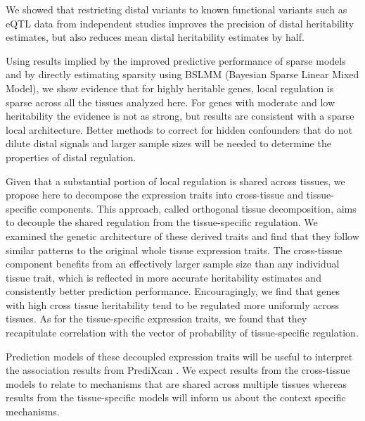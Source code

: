 \documentclass[10pt,letterpaper]{article}
\begin{document}
We showed that restricting distal variants to known functional variants such as eQTL data from independent studies improves the precision of distal heritability estimates, but also reduces mean distal heritability estimates by half. %

Using results implied by the improved predictive performance of sparse models and by directly estimating sparsity using BSLMM (Bayesian Sparse Linear Mixed Model), we show evidence that for highly heritable genes, local regulation is sparse across all the tissues analyzed here. For genes with moderate and low heritability the evidence is not as strong, but results are consistent with a sparse local architecture. Better methods to correct for hidden confounders that do not dilute distal signals and larger sample sizes will be needed to determine the properties of distal regulation. 

Given that a substantial portion of local regulation is shared across tissues, we propose here to decompose the expression traits into cross-tissue and tissue-specific components. This approach, called orthogonal tissue decomposition, aims to decouple the shared regulation from the tissue-specific regulation. We examined the genetic architecture of these derived traits and find that they follow similar patterns to the original whole tissue expression traits. The cross-tissue component benefits from an effectively larger sample size than any individual tissue trait, which is reflected in more accurate heritability estimates and consistently better prediction performance. Encouragingly, we find that genes with high cross tissue heritability tend to be regulated more uniformly across tissues. As for the tissue-specific expression traits, we found that they recapitulate correlation with the vector of probability of tissue-specific regulation. 

Prediction models of these decoupled expression traits will be useful to interpret the association results from PrediXcan \cite{Gamazon_2015}. We expect results from the cross-tissue models to relate to mechanisms that are shared across multiple tissues whereas results from the tissue-specific models will inform us about the context specific mechanisms. 
\end{document}
